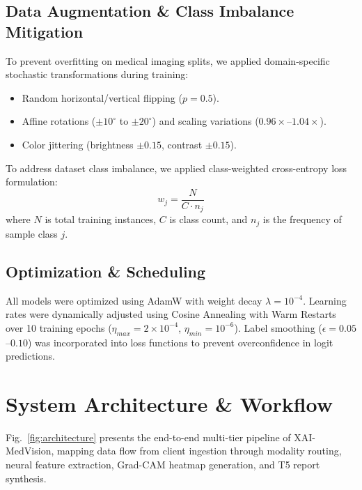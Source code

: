 \documentclass[conference]{IEEEtran}
\begin{document}
\subsection{Data Augmentation & Class Imbalance Mitigation}
To prevent overfitting on medical imaging splits, we applied domain-specific stochastic transformations during training:
\begin{itemize}
    \item Random horizontal/vertical flipping ($p=0.5$).
    \item Affine rotations ($\pm 10^\circ$ to $\pm 20^\circ$) and scaling variations ($0.96\times$--$1.04\times$).
    \item Color jittering (brightness $\pm 0.15$, contrast $\pm 0.15$).
\end{itemize}
To address dataset class imbalance, we applied class-weighted cross-entropy loss formulation:
\begin{equation}
w_j = \frac{N}{C \cdot n_j}
\end{equation}
where $N$ is total training instances, $C$ is class count, and $n_j$ is the frequency of sample class $j$.

\subsection{Optimization & Scheduling}
All models were optimized using AdamW with weight decay $\lambda = 10^{-4}$. Learning rates were dynamically adjusted using Cosine Annealing with Warm Restarts over 10 training epochs ($\eta_{max} = 2 \times 10^{-4}$, $\eta_{min} = 10^{-6}$). Label smoothing ($\epsilon = 0.05$--$0.10$) was incorporated into loss functions to prevent overconfidence in logit predictions.

\section{System Architecture \& Workflow}
Fig.~\ref{fig:architecture} presents the end-to-end multi-tier pipeline of XAI-MedVision, mapping data flow from client ingestion through modality routing, neural feature extraction, Grad-CAM heatmap generation, and T5 report synthesis.
\end{document}
